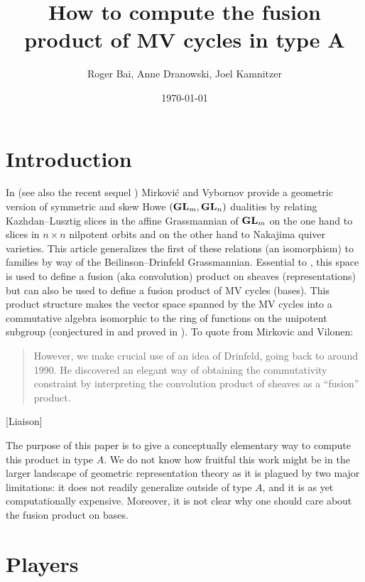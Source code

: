 \documentclass[draft]{article}
\title{How to compute the fusion product of MV cycles in type A}
\author{Roger Bai, Anne Dranowski, Joel Kamnitzer}
\date{\today}
\begin{document}
\maketitle

\section{Introduction}
% 
In \cite{mirkovic2007quiver} (see also the recent sequel \cite{mirkovic2019comparison}) Mirkovi\'c and Vybornov provide a geometric version of symmetric and skew Howe $({\mathbf{GL}}_m,{\mathbf{GL}}_n)$ dualities by relating Kazhdan--Lusztig slices in the affine Grassmannian of ${\mathbf{GL}}_m$ on the one hand to slices in $n\times n$ nilpotent orbits 
and on the other hand to Nakajima quiver varieties. 
This article generalizes the first of these relations (an isomorphism) to families by way of the Beilinson--Drinfeld Grassmannian. Essential to \cite{mirkovic2007geometric}, this space is used to define a fusion (aka convolution) product on sheaves (representations) but can also be used to define a fusion product of MV cycles (bases). 
% 
This product structure makes the vector space spanned by the MV cycles into a commutative algebra isomorphic to the ring of functions on the unipotent subgroup (conjectured in \cite{anderson2003polytope} and proved in \cite{baumann2019mirkovic}). %
% 
To quote from Mirkovic and Vilonen:
\begin{quotation}
    However, we make crucial use of an idea of Drinfeld, going back to around 1990. He discovered an elegant way of obtaining the commutativity constraint by interpreting the convolution product of sheaves as a ``fusion'' product.
\end{quotation}
% 
[Liaison]

The purpose of this paper is to give a conceptually elementary way to compute this product in type $A$. We do not know how fruitful this work might be in the larger landscape of geometric representation theory as it is plagued by two major limitations: it does not readily generalize outside of type $A$, and it is as yet computationally expensive. 
% 
Moreover, it is not clear why one should care about the fusion product on bases.     

\section{Players}
\end{document}
